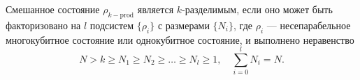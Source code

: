 Смешанное состояние $\rho_{k-\mathrm{prod}}$
является $k$-разделимым,
если оно может быть факторизовано на $l$ подсистем $\{\rho_i\}$ с размерами $\{N_i\}$,
где $\rho_i$ --- несепарабельное многокубитное состояние или однокубитное состояние,
и выполнено неравенство
\begin{equation}
  N > k \geq N_1 \geq N_2 \geq \dots \geq N_l \geq 1,
  \quad
  \sum_{i=0}^{l} N_i = N.
\end{equation}
